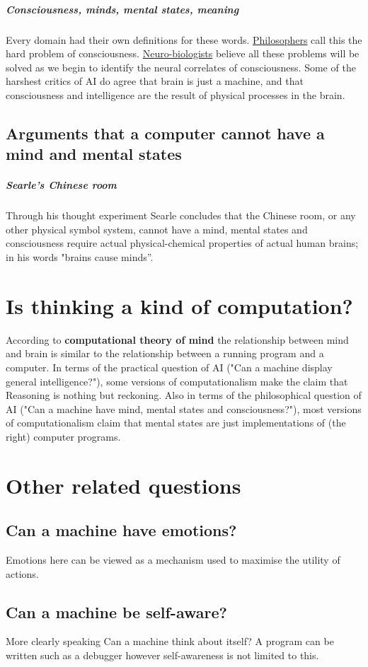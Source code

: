 \documentclass[10pt,a4paper,twoside]{article}
\begin{document}
\subparagraph{Consciousness, minds, mental states, meaning}
Every domain had their own definitions for these words. \underline{Philosophers} call this the hard problem of consciousness. \underline{Neuro-biologists} believe all these problems will be solved as we begin to identify the neural correlates of consciousness. Some of the harshest critics of AI do agree that brain is just a machine, and that consciousness and intelligence are the result of physical processes in the brain.

\subsection{Arguments that a computer cannot have a mind and mental states}
\subparagraph{Searle's Chinese room }
Through his thought experiment Searle concludes that the Chinese room, or any other physical symbol system, cannot have a mind, mental states and consciousness require actual physical-chemical properties of actual human brains; in his words "brains cause minds”.

\section{Is thinking a kind of computation?}
According to \textbf{computational theory of mind} the relationship between mind and brain is similar to the relationship between a running program and a computer. In terms of the practical question of AI ("Can a machine display general intelligence?"), some versions of computationalism make the claim that Reasoning is nothing but reckoning. Also in terms of the philosophical question of AI ("Can a machine have mind, mental states and consciousness?"), most versions of computationalism claim that mental states are just implementations of (the right) computer programs.

\section{Other related questions}
\subsection{Can a machine have emotions?} Emotions here can be viewed as a mechanism used to maximise the utility of actions.

\subsection{Can a machine be self-aware?} More clearly speaking Can a machine think about itself? A program can be written such as a debugger however self-awareness is not limited to this.
\end{document}
